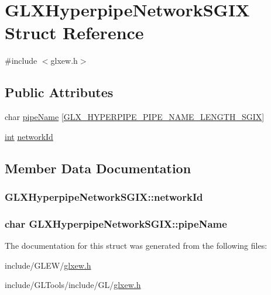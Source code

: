\hypertarget{struct_g_l_x_hyperpipe_network_s_g_i_x}{\section{G\-L\-X\-Hyperpipe\-Network\-S\-G\-I\-X Struct Reference}
\label{struct_g_l_x_hyperpipe_network_s_g_i_x}
}


{\ttfamily \#include $<$glxew.\-h$>$}

\subsection*{Public Attributes}
\begin{DoxyCompactItemize}
\item 
char \hyperlink{struct_g_l_x_hyperpipe_network_s_g_i_x_ad74834ae374ae01bf458f2e3bc989d76}{pipe\-Name} \mbox{[}\hyperlink{_g_l_tools_2include_2_g_l_2glxew_8h_ae1c8261c0861010d8003a31d07e26005}{G\-L\-X\-\_\-\-H\-Y\-P\-E\-R\-P\-I\-P\-E\-\_\-\-P\-I\-P\-E\-\_\-\-N\-A\-M\-E\-\_\-\-L\-E\-N\-G\-T\-H\-\_\-\-S\-G\-I\-X}\mbox{]}
\item 
\hyperlink{_s_d_l__thread_8h_a6a64f9be4433e4de6e2f2f548cf3c08e}{int} \hyperlink{struct_g_l_x_hyperpipe_network_s_g_i_x_a81393053988b32fadb0b21615024add1}{network\-Id}
\end{DoxyCompactItemize}


\subsection{Member Data Documentation}
\hypertarget{struct_g_l_x_hyperpipe_network_s_g_i_x_a81393053988b32fadb0b21615024add1}{
\subsubsection[{network\-Id}]{ G\-L\-X\-Hyperpipe\-Network\-S\-G\-I\-X\-::network\-Id}}\label{struct_g_l_x_hyperpipe_network_s_g_i_x_a81393053988b32fadb0b21615024add1}
\hypertarget{struct_g_l_x_hyperpipe_network_s_g_i_x_ad74834ae374ae01bf458f2e3bc989d76}{
\subsubsection[{pipe\-Name}]{\setlength{\rightskip}{0pt plus 5cm}char G\-L\-X\-Hyperpipe\-Network\-S\-G\-I\-X\-::pipe\-Name}}\label{struct_g_l_x_hyperpipe_network_s_g_i_x_ad74834ae374ae01bf458f2e3bc989d76}


The documentation for this struct was generated from the following files\-:\begin{DoxyCompactItemize}
\item 
include/\-G\-L\-E\-W/\hyperlink{_g_l_e_w_2glxew_8h}{glxew.\-h}\item 
include/\-G\-L\-Tools/include/\-G\-L/\hyperlink{_g_l_tools_2include_2_g_l_2glxew_8h}{glxew.\-h}\end{DoxyCompactItemize}
